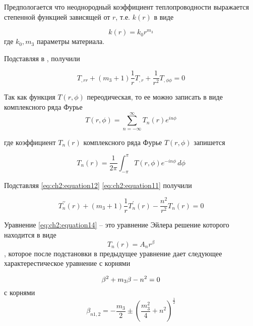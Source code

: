 Предпологается что неоднородный коэффициент теплопроводности выражается степенной функцией зависящей от \(r\), т.е. \(k(r)\) в виде

\begin{equation}
	\label{eq:ch2:equation10}
	k(r) = k_0 r^{m_3}
\end{equation}
где \(k_0, m_3\) параметры материала.

Подставляя \label{eq:ch2:equation8} в \label{eq:ch2:equation10}, получили

\begin{equation}
	\label{eq:ch2:equation11}
	T_{,rr} + (m_3+1)\frac{1}{r}T_{,r}+\frac{1}{r^2}T_{,\phi \phi} =0
\end{equation}

Так как функция \(T(r, \phi)\) переодическая, то ее можно записать в виде комплексного ряда Фурье
\begin{equation}
	\label{eq:ch2:equation12}
	T(r, \phi) = \sum_{n=-\infty}^{\infty} T_{n}(r) e^{in\phi}
\end{equation}

где коэффициент \(T_n(r)\) комплексного ряда Фурье \(T(r, \phi)\) запишется

\begin{equation}
	\label{eq:ch2:equation13}
	T_n(r) = \frac{1}{2\pi} \int_{-\pi}^{\pi} T(r, \phi) e^{-in\phi} \,d\phi
\end{equation}

Подставляя \cref{eq:ch2:equation12} \cref{eq:ch2:equation11} получили

\begin{equation}
	\label{eq:ch2:equation14}
	T_{n}^{\prime \prime}(r) + (m_3+1)\frac{1}{r}T_{n}^{\prime}(r)-\frac{n^2}{r^2}T_{n}(r) =0
\end{equation}

Уравнение \cref{eq:ch2:equation14} -- это уравнение Эйлера решение которого находится в виде 
\begin{equation}
	\label{eq:ch2:equation15}
	T_n(r) = A_n r^{\beta}
\end{equation}
, которое после подстановки в предыдущее уравнение дает следующее характерестическое уравнение с корнями

\begin{equation}
	\label{eq:ch2:equation16}
		\beta^2 +m_3 \beta - n^2 =0\\
\end{equation}
 с корнями
\begin{equation}
	\label{eq:ch2:equation17}
	\beta_{n1,2} = -\frac{m_3}{2} \pm \left(\frac{m^2_3}{4} + n^2 \right)^{\frac{1}{2}}
\end{equation}



